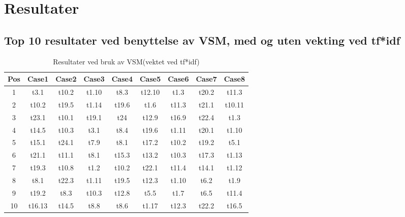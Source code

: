 \section{Resultater}
\label{sec:result}

\subsection{Top 10 resultater ved benyttelse av VSM, med og uten vekting ved tf*idf}

\begin{table}[h!]
\begin{center}
\begin{tabular}{ | c c c c c c c c c | }
\hline
\textbf{Pos} & \textbf{Case1} & \textbf{Case2} & \textbf{Case3} & \textbf{Case4} & \textbf{Case5} & \textbf{Case6} & \textbf{Case7} & \textbf{Case8} \\ \hline
1 & t3.1 & t10.2 & t1.10 & t8.3 & t12.10 & t1.3 & t20.2 & t11.3 \\
2 & t10.2 & t19.5 & t1.14 & t19.6 & t1.6 & t11.3 & t21.1 & t10.11 \\
3 & t23.1 & t10.1 & t19.1 & t24 & t12.9 & t16.9 & t22.4 & t1.3 \\
4 & t14.5 & t10.3 & t3.1 & t8.4 & t19.6 & t1.11 & t20.1 & t1.10 \\
5 & t15.1 & t24.1 & t7.9 & t8.1 & t17.2 & t10.2 & t19.2 & t5.1 \\
6 & t21.1 & t11.1 & t8.1 & t15.3 & t13.2 & t10.3 & t17.3 & t1.13 \\
7 & t19.3 & t10.8 & t1.2 & t10.2 & t22.1 & t11.4 & t14.1 & t1.12 \\
8 & t8.1 & t22.3 & t1.11 & t19.5 & t12.3 & t1.10 & t6.2 & t1.9 \\
9 & t19.2 & t8.3 & t10.3 & t12.8 & t5.5 & t1.7 & t6.5 & t11.4 \\
10 & t16.13 & t14.5 & t8.8 & t8.6 & t1.17 & t12.3 & t22.2 & t16.5 \\
\hline
\end{tabular}
\end{center}
\caption{Resultater ved bruk av VSM(vektet ved tf*idf)}
\end{table}

